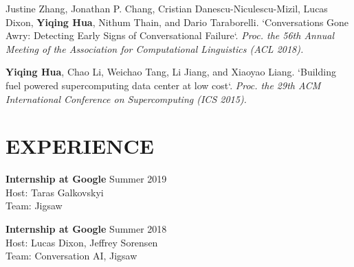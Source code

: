 \documentclass[margin, 10pt]{res} %
\begin{document}
\begin{resume}
Justine Zhang, Jonathan P. Chang, Cristian Danescu-Niculescu-Mizil, Lucas Dixon, \textbf{Yiqing Hua}, Nithum Thain, and Dario Taraborelli.
`Conversations Gone Awry: Detecting Early Signs of Conversational Failure`.
\textit{Proc. the 56th Annual Meeting of the Association for Computational Linguistics (ACL 2018).}

\textbf{Yiqing Hua}, Chao Li, Weichao Tang, Li Jiang, and Xiaoyao Liang.
`Building fuel powered supercomputing data center at low cost`.
\textit{Proc. the 29th ACM International Conference on Supercomputing (ICS 2015).}


\section{EXPERIENCE}
\textbf{Internship at Google} \hfill Summer 2019\\
Host: Taras Galkovskyi\\
Team: Jigsaw

\textbf{Internship at Google} \hfill Summer 2018\\
Host: Lucas Dixon, Jeffrey Sorensen\\
Team: Conversation AI, Jigsaw



\end{resume}
\end{document}
